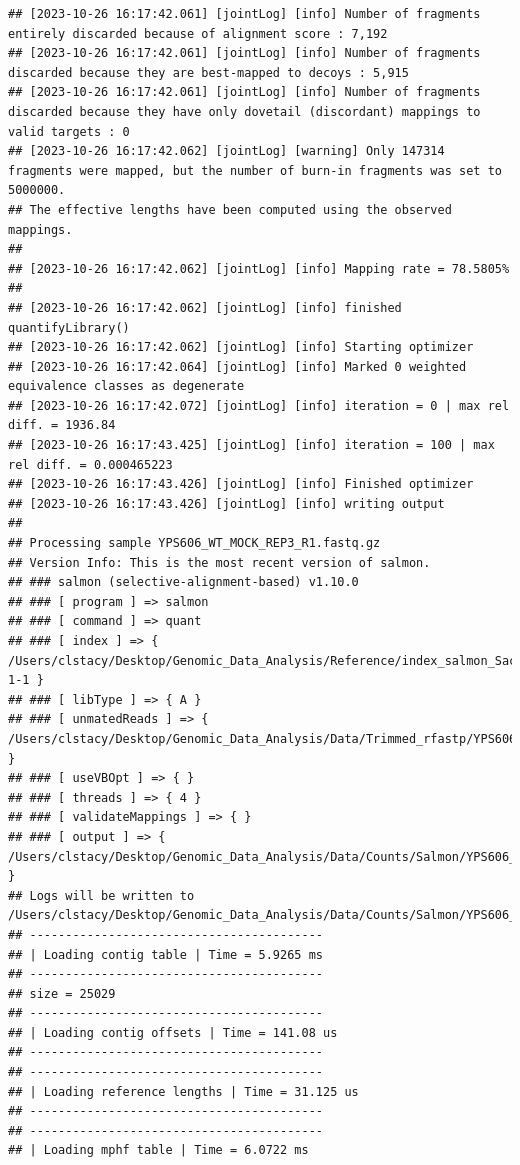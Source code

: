 \documentclass[
]{book}
\begin{document}
\begin{verbatim}
## [2023-10-26 16:17:42.061] [jointLog] [info] Number of fragments entirely discarded because of alignment score : 7,192
## [2023-10-26 16:17:42.061] [jointLog] [info] Number of fragments discarded because they are best-mapped to decoys : 5,915
## [2023-10-26 16:17:42.061] [jointLog] [info] Number of fragments discarded because they have only dovetail (discordant) mappings to valid targets : 0
## [2023-10-26 16:17:42.062] [jointLog] [warning] Only 147314 fragments were mapped, but the number of burn-in fragments was set to 5000000.
## The effective lengths have been computed using the observed mappings.
## 
## [2023-10-26 16:17:42.062] [jointLog] [info] Mapping rate = 78.5805%
## 
## [2023-10-26 16:17:42.062] [jointLog] [info] finished quantifyLibrary()
## [2023-10-26 16:17:42.062] [jointLog] [info] Starting optimizer
## [2023-10-26 16:17:42.064] [jointLog] [info] Marked 0 weighted equivalence classes as degenerate
## [2023-10-26 16:17:42.072] [jointLog] [info] iteration = 0 | max rel diff. = 1936.84
## [2023-10-26 16:17:43.425] [jointLog] [info] iteration = 100 | max rel diff. = 0.000465223
## [2023-10-26 16:17:43.426] [jointLog] [info] Finished optimizer
## [2023-10-26 16:17:43.426] [jointLog] [info] writing output 
## 
## Processing sample YPS606_WT_MOCK_REP3_R1.fastq.gz
## Version Info: This is the most recent version of salmon.
## ### salmon (selective-alignment-based) v1.10.0
## ### [ program ] => salmon 
## ### [ command ] => quant 
## ### [ index ] => { /Users/clstacy/Desktop/Genomic_Data_Analysis/Reference/index_salmon_Saccharomyces_cerevisiae.R64-1-1 }
## ### [ libType ] => { A }
## ### [ unmatedReads ] => { /Users/clstacy/Desktop/Genomic_Data_Analysis/Data/Trimmed_rfastp/YPS606_WT_MOCK_REP3_R1.fastq.gz }
## ### [ useVBOpt ] => { }
## ### [ threads ] => { 4 }
## ### [ validateMappings ] => { }
## ### [ output ] => { /Users/clstacy/Desktop/Genomic_Data_Analysis/Data/Counts/Salmon/YPS606_WT_MOCK_REP3_R1.fastq.gz_quant }
## Logs will be written to /Users/clstacy/Desktop/Genomic_Data_Analysis/Data/Counts/Salmon/YPS606_WT_MOCK_REP3_R1.fastq.gz_quant/logs
## -----------------------------------------
## | Loading contig table | Time = 5.9265 ms
## -----------------------------------------
## size = 25029
## -----------------------------------------
## | Loading contig offsets | Time = 141.08 us
## -----------------------------------------
## -----------------------------------------
## | Loading reference lengths | Time = 31.125 us
## -----------------------------------------
## -----------------------------------------
## | Loading mphf table | Time = 6.0722 ms

\end{verbatim}
\end{document}
